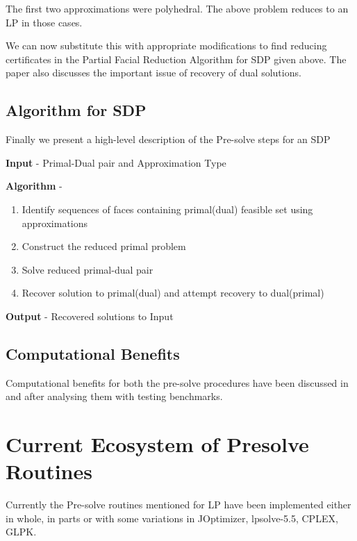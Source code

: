 \documentclass[twoside]{article}
\begin{document}
\begin{multicols}{2}
The first two approximations were polyhedral. The above problem reduces to an LP in those cases.

We can now substitute this with appropriate modifications to find reducing certificates in the Partial Facial Reduction Algorithm for SDP given above. The paper\cite{permenter2014partial} also discusses the important issue of recovery of dual solutions.

\vspace*{-\baselineskip}

\subsection{\textbf{Algorithm for SDP}}
Finally we present a high-level description of the Pre-solve steps for an SDP

\textbf{\color{blue}Input} - Primal-Dual pair and Approximation Type
\vspace{0.1in}

\textbf{\color{blue}Algorithm} -
\begin{enumerate}
    \item Identify sequences of faces containing primal(dual) feasible set using approximations
    \item Construct the reduced primal problem
    \item Solve reduced primal-dual pair
    \item Recover solution to primal(dual) and attempt recovery to dual(primal)
\end{enumerate}

\textbf{\color{blue}Output} - Recovered solutions to Input
\vspace*{-\baselineskip}

\subsection{\textbf{Computational Benefits}}
Computational benefits for both the pre-solve procedures have been discussed in \cite{ipm:Andersen9} and \cite{permenter2014partial} after analysing them with testing benchmarks.

\vspace*{-\baselineskip}

\section{\textbf{Current Ecosystem of Presolve Routines}}

Currently the Pre-solve routines mentioned for LP have been implemented either in whole, in parts or with some variations in JOptimizer, lpsolve-5.5, CPLEX, GLPK.


\end{multicols}
\end{document}
